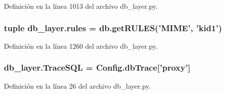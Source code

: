 Definición en la línea 1013 del archivo db\-\_\-layer.\-py.

\hypertarget{namespacedb__layer_aa5866ade4f254a145901ec8647407bdb}{
\subsubsection[{rules}]{\setlength{\rightskip}{0pt plus 5cm}tuple db\-\_\-layer.\-rules = db.\-get\-R\-U\-L\-E\-S('M\-I\-M\-E', 'kid1')}}\label{namespacedb__layer_aa5866ade4f254a145901ec8647407bdb}


Definición en la línea 1260 del archivo db\-\_\-layer.\-py.

\hypertarget{namespacedb__layer_ad65ee0b7707a738bc9f93587eebd04f6}{
\subsubsection[{Trace\-S\-Q\-L}]{\setlength{\rightskip}{0pt plus 5cm}db\-\_\-layer.\-Trace\-S\-Q\-L = {\bf Config.\-db\-Trace}\mbox{[}'proxy'\mbox{]}}}\label{namespacedb__layer_ad65ee0b7707a738bc9f93587eebd04f6}


Definición en la línea 26 del archivo db\-\_\-layer.\-py.

